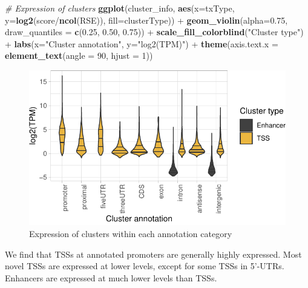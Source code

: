 \documentclass[9pt,a4paper,]{extarticle}
\newenvironment{Shaded}{\begin{snugshade}}{\end{snugshade}}
\newcommand{\KeywordTok}[1]{\textcolor[rgb]{0.13,0.29,0.53}{\textbf{{#1}}}}
\newcommand{\DataTypeTok}[1]{\textcolor[rgb]{0.13,0.29,0.53}{{#1}}}
\newcommand{\DecValTok}[1]{\textcolor[rgb]{0.00,0.00,0.81}{{#1}}}
\newcommand{\FloatTok}[1]{\textcolor[rgb]{0.00,0.00,0.81}{{#1}}}
\newcommand{\StringTok}[1]{\textcolor[rgb]{0.31,0.60,0.02}{{#1}}}
\newcommand{\CommentTok}[1]{\textcolor[rgb]{0.56,0.35,0.01}{\textit{{#1}}}}
\newcommand{\NormalTok}[1]{{#1}}
\begin{document}
\begin{Shaded}
\begin{Highlighting}[]
\CommentTok{# Expression of clusters}
\KeywordTok{ggplot}\NormalTok{(cluster_info, }\KeywordTok{aes}\NormalTok{(}\DataTypeTok{x=}\NormalTok{txType, }
                         \DataTypeTok{y=}\KeywordTok{log2}\NormalTok{(score/}\KeywordTok{ncol}\NormalTok{(RSE)), }
                         \DataTypeTok{fill=}\NormalTok{clusterType)) +}
\StringTok{    }\KeywordTok{geom_violin}\NormalTok{(}\DataTypeTok{alpha=}\FloatTok{0.75}\NormalTok{, }\DataTypeTok{draw_quantiles =} \KeywordTok{c}\NormalTok{(}\FloatTok{0.25}\NormalTok{, }\FloatTok{0.50}\NormalTok{, }\FloatTok{0.75}\NormalTok{)) +}
\StringTok{    }\KeywordTok{scale_fill_colorblind}\NormalTok{(}\StringTok{"Cluster type"}\NormalTok{) +}
\StringTok{    }\KeywordTok{labs}\NormalTok{(}\DataTypeTok{x=}\StringTok{"Cluster annotation"}\NormalTok{, }\DataTypeTok{y=}\StringTok{"log2(TPM)"}\NormalTok{) +}
\StringTok{    }\KeywordTok{theme}\NormalTok{(}\DataTypeTok{axis.text.x =} \KeywordTok{element_text}\NormalTok{(}\DataTypeTok{angle =} \DecValTok{90}\NormalTok{, }\DataTypeTok{hjust =} \DecValTok{1}\NormalTok{))}
\end{Highlighting}
\end{Shaded}

\begin{figure}

{\centering \includegraphics{CAGEWorkflow_files/figure-latex/plotTxTypes2-1} 

}

\caption{Expression of clusters within each annotation category}\label{fig:plotTxTypes2}
\end{figure}

We find that TSSs at annotated promoters are generally highly expressed. Most novel TSSs are expressed at lower levels, except for some TSSs in 5'-UTRs. Enhancers are expressed at much lower levels than TSSs.
\end{document}
